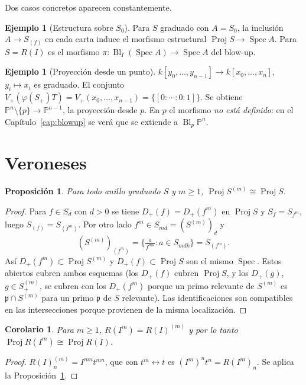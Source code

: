 \documentclass[11pt,a4paper,oneside]{book}
\newcommand{\Spec}{\operatorname{Spec}}
\newcommand{\Proj}{\operatorname{Proj}}
\newcommand{\Bl}{\operatorname{Bl}}
\newcommand{\PP}{\mathbb{P}}
\theoremstyle{plain}
\newtheorem{proposicion}[teorema]{Proposición}
\newtheorem{corolario}[teorema]{Corolario}
\theoremstyle{definition}
\newtheorem{ejemplo}[teorema]{Ejemplo}
\theoremstyle{remark}
\begin{document}
Dos casos concretos aparecen constantemente.

\begin{ejemplo}[Estructura sobre $S_0$]\label{ej:estructural}
Para $S$ graduado con $A=S_0$, la inclusión $A\to S_{(f)}$ en cada carta induce el morfismo estructural $\Proj S\to\Spec A$. Para $S=R(I)$ es el morfismo $\pi:\Bl_I(\Spec A)\to\Spec A$ del blow-up.
\end{ejemplo}

\begin{ejemplo}[Proyección desde un punto]\label{ej:proyeccion-prelim}
$k[y_0,\dots,y_{n-1}]\to k[x_0,\dots,x_n]$, $y_i\mapsto x_i$ es graduado. El conjunto $V_+(\varphi(S_+)T)=V_+(x_0,\dots,x_{n-1})=\{[0:\cdots:0:1]\}$. Se obtiene $\PP^n\setminus\{p\}\to\PP^{n-1}$, la proyección desde $p$. En $p$ el morfismo \emph{no está definido}: en el Capítulo~\ref{cap:blowup} se verá que se extiende a $\Bl_p\PP^n$.
\end{ejemplo}

\section{Veroneses}

\begin{proposicion}\label{prop:veronese}
Para todo anillo graduado $S$ y $m\ge1$, $\Proj S^{(m)}\cong\Proj S$.
\end{proposicion}

\begin{proof}
Para $f\in S_d$ con $d>0$ se tiene $D_+(f)=D_+(f^m)$ en $\Proj S$ y $S_f=S_{f^m}$, luego $S_{(f)}=S_{(f^m)}$. Por otro lado $f^m\in S_{md}=(S^{(m)})_d$ y
\[
(S^{(m)})_{(f^m)}=\Big\{\tfrac{a}{f^{mk}}: a\in S_{mdk}\Big\}=S_{(f^m)} .
\]
Así $D_+(f^m)\subset\Proj S^{(m)}$ y $D_+(f)\subset\Proj S$ son el mismo $\Spec$. Estos abiertos cubren ambos esquemas (los $D_+(f)$ cubren $\Proj S$, y los $D_+(g)$, $g\in S^{(m)}_+$, se cubren con los $D_+(f^m)$ porque un primo relevante de $S^{(m)}$ es $\mathfrak p\cap S^{(m)}$ para un primo $\mathfrak p$ de $S$ relevante). Las identificaciones son compatibles en las intersecciones porque provienen de la misma localización.
\end{proof}

\begin{corolario}\label{cor:potencias-rees}
Para $m\ge1$, $R(I^m)=R(I)^{(m)}$ y por lo tanto $\Proj R(I^m)\cong\Proj R(I)$.
\end{corolario}

\begin{proof}
$R(I)^{(m)}_n=I^{mn}t^{mn}$, que con $t^m\leftrightarrow t$ es $(I^m)^n t^n=R(I^m)_n$. Se aplica la Proposición~\ref{prop:veronese}.
\end{proof}
\end{document}

